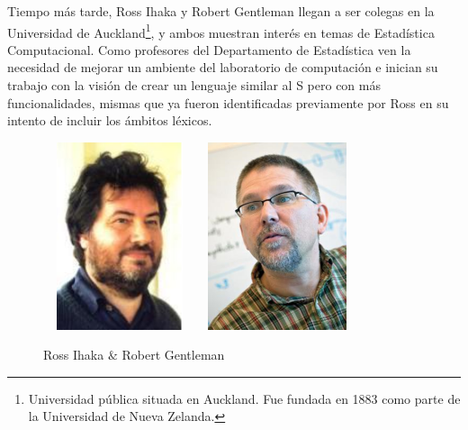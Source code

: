 \documentclass[11pt,a4paper,oneside]{book}\usepackage[]{graphicx}\usepackage[]{color}
\begin{document}
Tiempo más tarde, Ross Ihaka y Robert Gentleman llegan a ser colegas en la Universidad de Auckland\footnote{Universidad pública situada en Auckland. Fue fundada en 1883 como parte de la Universidad de Nueva Zelanda.}, y ambos muestran interés en temas de Estadística Computacional. Como profesores del Departamento de Estadística ven la necesidad de mejorar un ambiente del laboratorio de computación e inician su trabajo con la visión de crear un lenguaje similar al S pero con más funcionalidades, mismas que ya fueron identificadas previamente por Ross en su intento de incluir los ámbitos léxicos.

\begin{figure}[H]
\centering
\includegraphics[height=5.5cm, width=4.5cm]{figuras/Ross.eps}\qquad
\includegraphics[height=5.5cm, width=4.5cm]{figuras/Robert.eps}
\caption{Ross Ihaka $\&$ Robert Gentleman}
\label{creadores}
\end{figure}
\end{document}
